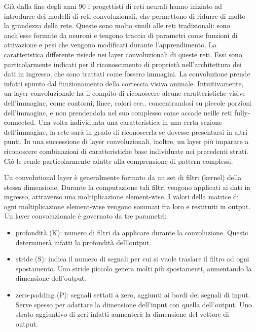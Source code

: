 \documentclass{article}
\begin{document}
Già dalla fine degli anni 90 i progettisti di reti neurali hanno iniziato ad introdurre dei modelli di reti convoluzionali, che permettono di ridurre di molto la grandezza della rete. Queste sono molto simili alle reti tradizionali: sono anch'esse formate da neuroni e tengono traccia di parametri come funzioni di attivazione e pesi che vengono modificati durante l'apprendimento. La caratteristica differente risiede nei layer convoluzionali di queste reti. Essi sono particolarmente indicati per il riconoscimento di proprietà nell'architettura dei dati in ingresso, che sono trattati come fossero immagini. La convoluzione prende infatti spunto dal funzionamento della corteccia visiva animale. Intuitivamente, un layer convoluzionale ha il compito di riconoscere alcune caratteristiche visive dell'immagine, come contorni, linee, colori ecc.. concentrandosi su piccole porzioni dell'immagine, e non prendendola nel suo complesso come accade neille reti fully-connected. Una volta individuata una caratteristica in una certa sezione dell'immagine, la rete sarà in grado di riconoscerla se dovesse presentarsi in altri punti. In una successione di layer convoluzionali, inoltre, un layer più imparare a riconoscere combinazioni di caratteristiche base individuate nei precedenti strati. Ciò le rende particolarmente adatte alla comprensione di pattern complessi.

Un convolutional layer è generalmente formato da un set di filtri (kernel) della stessa dimensione. Durante la computazione tali filtri vengono applicati ai dati in ingresso, attraverso una moltiplicazione element-wise. I valori della matrice di ogni moltiplicazione element-wise vengono sommati fra loro e restituiti in output.
Un layer convoluzionale è governato da tre parametri:
\begin{itemize}
\item profondità (K): numero di filtri da applicare durante la convoluzione. Questo determinerà infatti la profondità dell'output.
\item stride (S): indica il numero di segnali per cui si vuole traslare il filtro ad ogni spostamento. Uno stride piccolo genera molti più spostamenti, aumentando la dimensione dell'output. 
\item zero-padding (P): segnali settati a zero, aggiunti ai bordi dei segnali di input. Serve spesso per adattare la dimensione dell'input con quella dell'output. Uno strato aggiuntivo di zeri infatti aumenterà la dimensione del vettore di output. 
\end{itemize}
\end{document}
